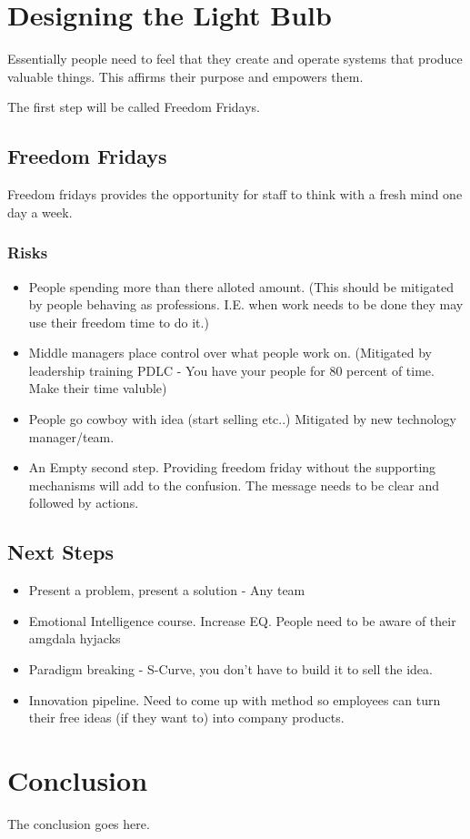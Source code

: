 \documentclass[conference]{IEEEtran}
\begin{document}
\section{Designing the Light Bulb}
Essentially people need to feel that they create and operate systems that
produce valuable things. This affirms their purpose and empowers them.

The first step will be called Freedom Fridays.

\subsection{Freedom Fridays}
Freedom fridays provides the opportunity for staff to think with a fresh mind
one day a week. 


\subsubsection{Risks}
\begin{itemize}
    \item People spending more than there alloted amount. (This should be
mitigated by people behaving as professions. I.E. when work needs to be done they may use
their freedom time to do it.)
    \item Middle managers place control over what people work on. (Mitigated by
leadership training PDLC - You have your people for 80 percent of time. Make
their time valuble)
    \item People go cowboy with idea (start selling etc..) Mitigated by new technology
manager/team. 
    \item An Empty second step. Providing freedom friday without the supporting
mechanisms will add to the confusion. The message needs to be clear and
followed by actions.
\end{itemize}

\subsection{Next Steps}
\begin{itemize}
    \item Present a problem, present a solution - Any team
    \item Emotional Intelligence course. Increase EQ. People need to be aware of their
amgdala hyjacks
    \item Paradigm breaking - S-Curve, you don't have to build it to sell the
    idea.
    \item Innovation pipeline. Need to come up with method so employees can turn their
free ideas (if they want to) into company products.
\end{itemize}

\section{Conclusion}
The conclusion goes here.
\end{document}
